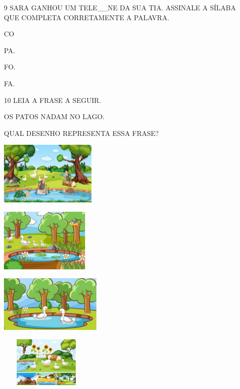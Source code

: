 
\num{9} SARA GANHOU UM TELE\_\_NE DA SUA TIA. ASSINALE A SÍLABA QUE COMPLETA CORRETAMENTE A PALAVRA.

\begin{escolha}
\item CO

\item PA.

\item FO.

\item FA.
\end{escolha}


\num{10} LEIA A FRASE A SEGUIR.

OS PATOS NADAM NO LAGO.

QUAL DESENHO REPRESENTA ESSA FRASE?

\begin{escolha}
\item \includegraphics[width=1.85903in,height=1.21806in]{media/image250.jpg}

\item \includegraphics[width=1.71806in,height=1.21875in]{media/image251.jpg}

\item \includegraphics[width=1.96319in,height=1.09028in]{media/image252.jpg}

\item \includegraphics[width=1.78681in,height=0.96806in]{media/image253.jpg}
\end{escolha}

